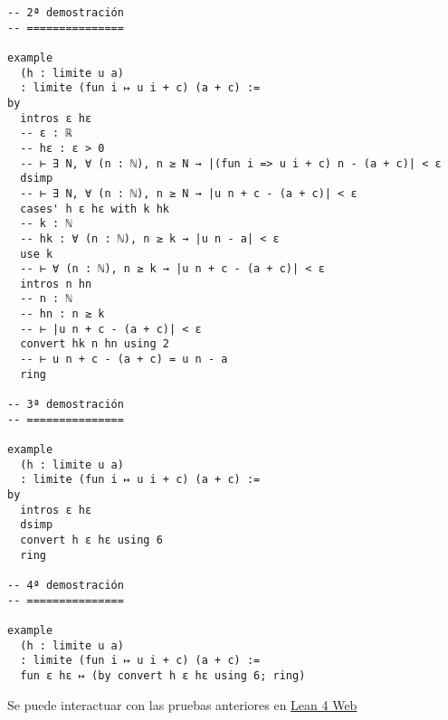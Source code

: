 \begin{verbatim}
-- 2ª demostración
-- ===============

example
  (h : limite u a)
  : limite (fun i ↦ u i + c) (a + c) :=
by
  intros ε hε
  -- ε : ℝ
  -- hε : ε > 0
  -- ⊢ ∃ N, ∀ (n : ℕ), n ≥ N → |(fun i => u i + c) n - (a + c)| < ε
  dsimp
  -- ⊢ ∃ N, ∀ (n : ℕ), n ≥ N → |u n + c - (a + c)| < ε
  cases' h ε hε with k hk
  -- k : ℕ
  -- hk : ∀ (n : ℕ), n ≥ k → |u n - a| < ε
  use k
  -- ⊢ ∀ (n : ℕ), n ≥ k → |u n + c - (a + c)| < ε
  intros n hn
  -- n : ℕ
  -- hn : n ≥ k
  -- ⊢ |u n + c - (a + c)| < ε
  convert hk n hn using 2
  -- ⊢ u n + c - (a + c) = u n - a
  ring

-- 3ª demostración
-- ===============

example
  (h : limite u a)
  : limite (fun i ↦ u i + c) (a + c) :=
by
  intros ε hε
  dsimp
  convert h ε hε using 6
  ring

-- 4ª demostración
-- ===============

example
  (h : limite u a)
  : limite (fun i ↦ u i + c) (a + c) :=
  fun ε hε ↦ (by convert h ε hε using 6; ring)
\end{verbatim}
Se puede interactuar con las pruebas anteriores en \href{https://lean.math.hhu.de/\#url=https://raw.githubusercontent.com/jaalonso/Calculemus2/main/src/Limite\_cuando\_se\_suma\_una\_constante.lean}{Lean 4 Web}

